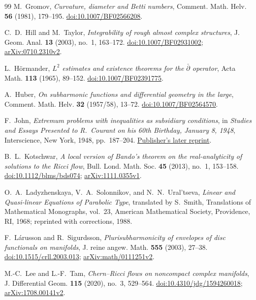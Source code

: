 \documentclass[11pt]{article}
\theoremstyle{definition}
\theoremstyle{remark}
\numberwithin{equation}{section}
\begin{document}
\begin{thebibliography}{99}
M.~Gromov,
\emph{Curvature, diameter and Betti numbers},
Comment. Math. Helv. \textbf{56} (1981), 179--195.
\href{https://doi.org/10.1007/BF02566208}{doi:10.1007/BF02566208}.

C.~D.~Hill and M.~Taylor,
\emph{Integrability of rough almost complex structures},
J. Geom. Anal. \textbf{13} (2003), no.~1, 163--172.
\href{https://doi.org/10.1007/BF02931002}{doi:10.1007/BF02931002};
\href{https://arxiv.org/abs/0710.2310v2}{arXiv:0710.2310v2}.

L.~H\"ormander,
\emph{$L^2$ estimates and existence theorems for the
$\bar\partial$ operator},
Acta Math. \textbf{113} (1965), 89--152.
\href{https://doi.org/10.1007/BF02391775}{doi:10.1007/BF02391775}.

A.~Huber,
\emph{On subharmonic functions and differential geometry in the large},
Comment. Math. Helv. \textbf{32} (1957/58), 13--72.
\href{https://doi.org/10.1007/BF02564570}{doi:10.1007/BF02564570}.

F.~John,
\emph{Extremum problems with inequalities as subsidiary conditions},
in \emph{Studies and Essays Presented to R.~Courant on his 60th Birthday,
January 8, 1948}, Interscience, New York, 1948, pp.~187--204.
\href{https://doi.org/10.1007/978-3-0348-0439-4_9}{Publisher's later reprint}.

B.~L.~Kotschwar,
\emph{A local version of Bando's theorem on the real-analyticity
of solutions to the Ricci flow},
Bull. Lond. Math. Soc. \textbf{45} (2013), no.~1, 153--158.
\href{https://doi.org/10.1112/blms/bds074}{doi:10.1112/blms/bds074};
\href{https://arxiv.org/abs/1111.0355v1}{arXiv:1111.0355v1}.

O.~A.~Ladyzhenskaya, V.~A.~Solonnikov, and N.~N.~Ural'tseva,
\emph{Linear and Quasi-linear Equations of Parabolic Type},
translated by S.~Smith,
Translations of Mathematical Monographs, vol.~23,
American Mathematical Society, Providence, RI, 1968;
reprinted with corrections, 1988.

F.~L\'arusson and R.~Sigurdsson,
\emph{Plurisubharmonicity of envelopes of disc functionals on manifolds},
J. reine angew. Math. \textbf{555} (2003), 27--38.
\href{https://doi.org/10.1515/crll.2003.013}
{doi:10.1515/crll.2003.013};
\href{https://arxiv.org/abs/math/0111251v2}{arXiv:math/0111251v2}.

M.-C.~Lee and L.-F.~Tam,
\emph{Chern--Ricci flows on noncompact complex manifolds},
J. Differential Geom. \textbf{115} (2020), no.~3, 529--564.
\href{https://doi.org/10.4310/jdg/1594260018}
{doi:10.4310/jdg/1594260018};
\href{https://arxiv.org/abs/1708.00141v2}{arXiv:1708.00141v2}.


\end{thebibliography}
\end{document}
